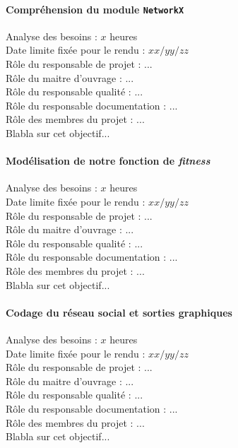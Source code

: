 \paragraph*{Compréhension du module \verb?NetworkX?\\}
Analyse des besoins : $x$ heures\\
Date limite fixée pour le rendu : $xx/yy/zz$\\
Rôle du responsable de projet : ...\\
Rôle du maitre d'ouvrage : ...\\
Rôle du responsable qualité : ...\\
Rôle du responsable documentation : ...\\
Rôle des membres du projet : ...\\
Blabla sur cet objectif...

\paragraph*{Modélisation de notre fonction de \textit{fitness}\\}
Analyse des besoins : $x$ heures\\
Date limite fixée pour le rendu : $xx/yy/zz$\\
Rôle du responsable de projet : ...\\
Rôle du maitre d'ouvrage : ...\\
Rôle du responsable qualité : ...\\
Rôle du responsable documentation : ...\\
Rôle des membres du projet : ...\\
Blabla sur cet objectif...

\paragraph*{Codage du réseau social et sorties graphiques\\}
Analyse des besoins : $x$ heures\\
Date limite fixée pour le rendu : $xx/yy/zz$\\
Rôle du responsable de projet : ...\\
Rôle du maitre d'ouvrage : ...\\
Rôle du responsable qualité : ...\\
Rôle du responsable documentation : ...\\
Rôle des membres du projet : ...\\
Blabla sur cet objectif...

